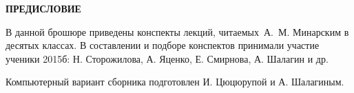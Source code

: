 \begin{center}
	\textbf{ПРЕДИСЛОВИЕ}
\end{center}

В данной брошюре приведены конспекты лекций, читаемых~А.~М. Минарским в десятых классах. В составлении и подборе конспектов принимали участие ученики 2015б: Н. Сторожилова, А. Яценко, Е. Смирнова, А. Шалагин и др. \par

Компьютерный вариант сборника подготовлен И. Цюцюрупой и А. Шалагиным.